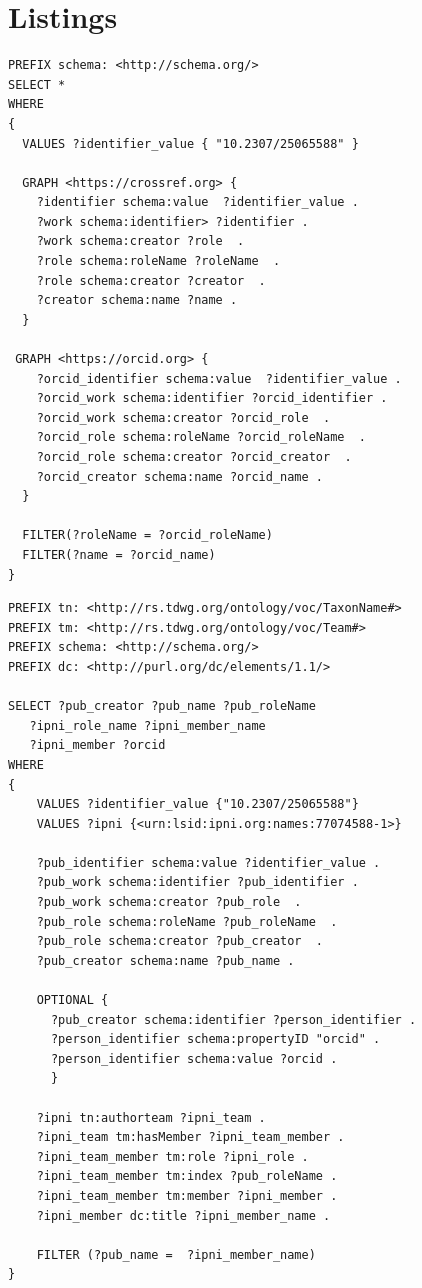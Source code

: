 \documentclass[runningheads]{llncs}
\begin{document}
%
%
%


%

\section{Listings}

\begin{lstlisting}[captionpos=b, caption=SPARQL query to match authors in CrossRef and ORCID, label=sparql1,
   basicstyle=\ttfamily,frame=single]
PREFIX schema: <http://schema.org/>
SELECT *
WHERE
{
  VALUES ?identifier_value { "10.2307/25065588" }
  
  GRAPH <https://crossref.org> {
    ?identifier schema:value  ?identifier_value .
    ?work schema:identifier> ?identifier .
    ?work schema:creator ?role  . 
    ?role schema:roleName ?roleName  .    
    ?role schema:creator ?creator  .    
    ?creator schema:name ?name .     
  }
    
 GRAPH <https://orcid.org> {
    ?orcid_identifier schema:value  ?identifier_value .
    ?orcid_work schema:identifier ?orcid_identifier .
    ?orcid_work schema:creator ?orcid_role  . 
    ?orcid_role schema:roleName ?orcid_roleName  .    
    ?orcid_role schema:creator ?orcid_creator  .    
    ?orcid_creator schema:name ?orcid_name .
  }
        
  FILTER(?roleName = ?orcid_roleName) 
  FILTER(?name = ?orcid_name) 
}   
\end{lstlisting}

\begin{lstlisting}[captionpos=b, caption=SPARQL query to match author in IPNI and ORCID, label=sparql,
   basicstyle=\ttfamily,frame=single]
PREFIX tn: <http://rs.tdwg.org/ontology/voc/TaxonName#>
PREFIX tm: <http://rs.tdwg.org/ontology/voc/Team#>
PREFIX schema: <http://schema.org/>
PREFIX dc: <http://purl.org/dc/elements/1.1/>

SELECT ?pub_creator ?pub_name ?pub_roleName 
   ?ipni_role_name ?ipni_member_name 
   ?ipni_member ?orcid
WHERE
{
    VALUES ?identifier_value {"10.2307/25065588"}
    VALUES ?ipni {<urn:lsid:ipni.org:names:77074588-1>} 
 
    ?pub_identifier schema:value ?identifier_value .
    ?pub_work schema:identifier ?pub_identifier .
    ?pub_work schema:creator ?pub_role  . 
    ?pub_role schema:roleName ?pub_roleName  .    
    ?pub_role schema:creator ?pub_creator  .    
    ?pub_creator schema:name ?pub_name .
  
    OPTIONAL {
      ?pub_creator schema:identifier ?person_identifier .
      ?person_identifier schema:propertyID "orcid" .
      ?person_identifier schema:value ?orcid .
      }
  
    ?ipni tn:authorteam ?ipni_team .
    ?ipni_team tm:hasMember ?ipni_team_member .
    ?ipni_team_member tm:role ?ipni_role .
    ?ipni_team_member tm:index ?pub_roleName .
    ?ipni_team_member tm:member ?ipni_member .
    ?ipni_member dc:title ?ipni_member_name .

    FILTER (?pub_name =  ?ipni_member_name)
}
\end{lstlisting}
\end{document}
